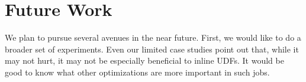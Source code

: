 \section{Future Work \label{sec:future}}

We plan to pursue several avenues in the near future.
First, we would like to do a broader set of experiments.
Even our limited case studies point out that, while it may not hurt, it may not be especially beneficial to inline UDFs.
It would be good to know what other optimizations are more important in such jobs.
